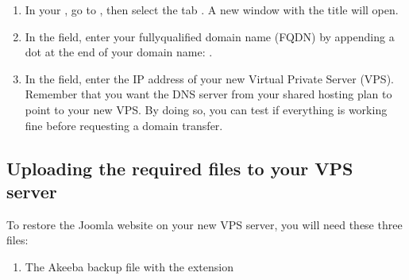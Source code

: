 \documentclass[a4paper,10pt,english,openany,oneside]{sphinxmanual}
\begin{document}
\begin{sloppypar}
\begin{enumerate}
\begin{quote}
\begin{figure}[H]
\centering

\noindent{}
\end{figure}
\end{quote}

\item {} 
\sphinxAtStartPar
In your , go to , then select the tab . A new window with the title  will open.
\begin{quote}

\begin{figure}[H]
\centering

\noindent{}
\end{figure}
\end{quote}

\item {} 
\sphinxAtStartPar
In the  field, enter your fully\sphinxhyphen{}qualified domain name (FQDN) by appending a dot at the end of your domain name: .
\begin{quote}

\begin{figure}[H]
\centering

\noindent{}
\end{figure}
\end{quote}

\item {} 
\sphinxAtStartPar
In the  field, enter the IP address of your new Virtual Private Server (VPS). Remember that you want the DNS server from your shared hosting plan to point to your new VPS. By doing so, you can test if everything is working fine before requesting a domain transfer.
\begin{quote}

\begin{figure}[H]
\centering

\noindent{}
\end{figure}
\end{quote}

\end{enumerate}


\subsection{Uploading the required files to your VPS server}
\label{\detokenize{joomla-to-vps:uploading-the-required-files-to-your-vps-server}}
\sphinxAtStartPar
To restore the Joomla website on your new VPS server, you will need these three files:
\begin{enumerate}
%
\item {} 
\sphinxAtStartPar
The Akeeba backup file with the  extension


\end{enumerate}
\end{sloppypar}
\end{document}
